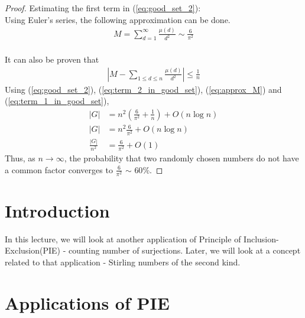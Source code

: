 \begin{proof}
Estimating the first term in (\ref{eq:good_set_2}):\\
Using Euler's series, the following approximation can be done.
\begin{align}
M = \sum_{d=1}^{\infty} \frac{\mu(d)}{d^2} \sim \frac{6}{\pi^2} \label{eq:approx_M}
\end{align} \\
It can also be proven that
\begin{align}
|M-\sum_{1 \le d \le n} \frac{\mu(d)}{d^2}| \le \frac{1}{n}\label{eq:term_1_in_good_set}
\end{align}
Using (\ref{eq:good_set_2}), (\ref{eq:term_2_in_good_set}), (\ref{eq:approx_M}) and (\ref{eq:term_1_in_good_set}),
\begin{align*}
|G| &= n^2 (\frac{6}{\pi^2} + \frac{1}{n})+ O(n \log{n})\\
|G| &= n^2 \frac{6}{\pi^2} + O(n \log{n})\\
\frac{|G|}{n^2}&=\frac{6}{\pi^2} + O(1)
\end{align*}
Thus, as $n\rightarrow \infty$, the probability that two randomly chosen numbers do not have a common factor converges to $\frac{6}{\pi^2}$ $\sim$ $60\%$.
\end{proof}


\section{Introduction}
In this lecture, we will look at another application of Principle of Inclusion-Exclusion(PIE) - counting number of surjections. Later, we will look at a concept related to that application - Stirling numbers of the second kind.

\section{Applications of PIE} \label{sec:Applications of PIE - lec2}

